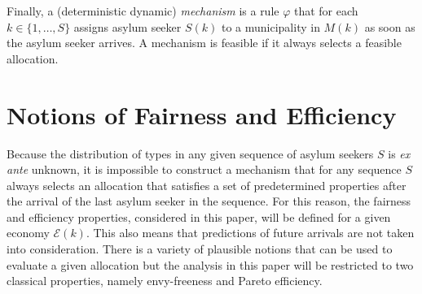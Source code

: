 \documentclass[12pt,fleqn]{article}
\begin{document}
Finally, a (deterministic dynamic) \emph{mechanism} is a rule $\varphi$ that for each $k\in\{1,\ldots,S\}$ assigns asylum seeker $S(k)$ to a municipality in $M(k)$ as soon as the asylum seeker arrives. A mechanism is feasible if it always selects a feasible allocation.

\section{Notions of Fairness and Efficiency}\label{SEC:Fair_Efficient}
Because the distribution of types in any given sequence of asylum seekers $S$ is \emph{ex ante} unknown, it is impossible to construct a mechanism that for any sequence $S$ always selects an allocation that satisfies a set of predetermined properties after the arrival of the last asylum seeker in the sequence. For this reason, the fairness and efficiency properties, considered in this paper, will be defined for a given economy $\mathcal{E}(k)$. This also means that predictions of future arrivals are not taken into consideration. There is a variety of plausible notions that can be used to evaluate a given allocation but the analysis in this paper will be restricted to two classical properties, namely envy-freeness and Pareto efficiency.
\end{document}
